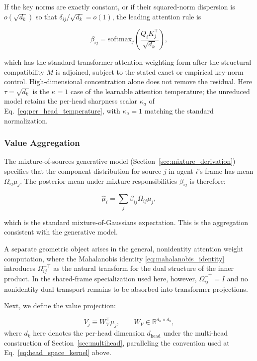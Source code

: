 \documentclass[twoside,11pt]{article}
\begin{document}
If the key norms are exactly constant, or if their squared-norm dispersion is $o(\sqrt{d_k})$ so that $\delta_{ij}/\sqrt{d_k}=o(1)$, the leading attention rule is

\begin{equation}
\boxed{\beta_{ij} = \mathrm{softmax}_j\left(\frac{Q_i K_j^\top}{\sqrt{d_k}}\right)},
\end{equation}

which has the standard transformer attention-weighting form after the structural compatibility $M$ is adjoined, subject to the stated exact or empirical key-norm control. High-dimensional concentration alone does not remove the residual. Here $\tau = \sqrt{d_k}$ is the $\kappa = 1$ case of the learnable attention temperature; the unreduced model retains the per-head sharpness scalar $\kappa_a$ of Eq.~\eqref{eq:per_head_temperature}, with $\kappa_a = 1$ matching the standard normalization.

\subsubsection{Value Aggregation}\label{sec:value_aggregation}

The mixture-of-sources generative model (Section~\ref{sec:mixture_derivation}) specifies that the component distribution for source $j$ in agent $i$'s frame has mean $\Omega_{ij}\mu_j$. The posterior mean under mixture responsibilities $\beta_{ij}$ is therefore:

\begin{equation}
\hat\mu_i = \sum_j \beta_{ij} \Omega_{ij}\mu_j,
\label{eq:glk_mixture_aggregation}
\end{equation}

which is the standard mixture-of-Gaussians expectation. This is the aggregation consistent with the generative model.

A separate geometric object arises in the general, nonidentity attention weight computation, where the Mahalanobis identity \eqref{eq:mahalanobis_identity} introduces $\Omega_{ij}^{-\top}$ as the natural transform for the dual structure of the inner product. In the shared-frame specialization used here, however, $\Omega_{ij}^{-\top} = I$ and no nonidentity dual transport remains to be absorbed into transformer projections.


Next, we define the value projection:

\begin{equation}
V_j \equiv W_V^{\top}\mu_j, \qquad W_V \in \mathbb{R}^{d_k \times d_k},
\end{equation}
where $d_k$ here denotes the per-head dimension $d_{\text{head}}$ under the multi-head construction of Section~\ref{sec:multihead}, paralleling the convention used at Eq.~\eqref{eq:head_space_kernel} above.
\end{document}
